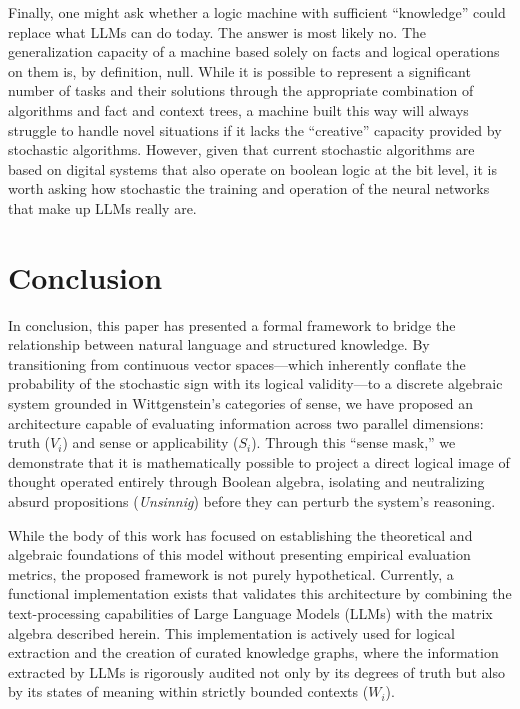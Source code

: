 \documentclass{article}
\begin{document}
Finally, one might ask whether a logic machine with sufficient
``knowledge'' could replace what LLMs can do today. The answer is most
likely no. The generalization capacity of a machine based solely on
facts and logical operations on them is, by definition, null. While it
is possible to represent a significant number of tasks and their
solutions through the appropriate combination of algorithms and fact and
context trees, a machine built this way will always struggle to handle
novel situations if it lacks the ``creative'' capacity provided by
stochastic algorithms. However, given that current stochastic algorithms
are based on digital systems that also operate on boolean logic at the
bit level, it is worth asking how stochastic the training and operation
of the neural networks that make up LLMs really are.

\hypertarget{conclusion}{%
\section{Conclusion}\label{conclusion}}

In conclusion, this paper has presented a formal framework to bridge the
relationship between natural language and structured knowledge. By
transitioning from continuous vector spaces---which inherently conflate
the probability of the stochastic sign with its logical validity---to a
discrete algebraic system grounded in Wittgenstein's categories of
sense, we have proposed an architecture capable of evaluating
information across two parallel dimensions: truth (\(V_i\)) and sense or
applicability (\(S_i\)). Through this ``sense mask,'' we demonstrate
that it is mathematically possible to project a direct logical image of
thought operated entirely through Boolean algebra, isolating and
neutralizing absurd propositions (\emph{Unsinnig}) before they can
perturb the system's reasoning.

While the body of this work has focused on establishing the theoretical
and algebraic foundations of this model without presenting empirical
evaluation metrics, the proposed framework is not purely hypothetical.
Currently, a functional implementation exists that validates this
architecture by combining the text-processing capabilities of Large
Language Models (LLMs) with the matrix algebra described herein. This
implementation is actively used for logical extraction and the creation
of curated knowledge graphs, where the information extracted by LLMs is
rigorously audited not only by its degrees of truth but also by its
states of meaning within strictly bounded contexts (\(W_i\)).
\end{document}
